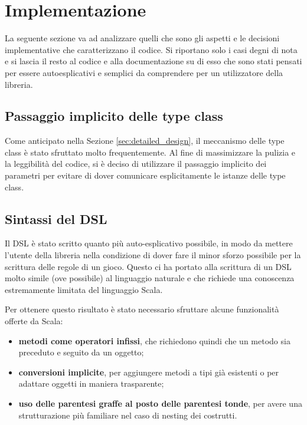 \section{Implementazione}

La seguente sezione va ad analizzare quelli che sono gli aspetti e le decisioni implementative che caratterizzano il codice.
%
Si riportano solo i casi degni di nota e si lascia il resto al codice e alla documentazione su di esso che sono stati pensati per essere autoesplicativi e semplici da comprendere per un utilizzatore della libreria.


\subsection{Passaggio implicito delle type class}

Come anticipato nella Sezione \ref{sec:detailed_design}, il meccanismo delle type class è stato sfruttato molto frequentemente.
%
Al fine di massimizzare la pulizia e la leggibilità del codice, si è deciso di utilizzare il passaggio implicito dei parametri per evitare di dover comunicare esplicitamente le istanze delle type class.


\subsection{Sintassi del DSL}

Il DSL è stato scritto quanto più auto-esplicativo possibile, in modo da mettere l'utente della libreria nella condizione di dover fare il minor sforzo possibile per la scrittura delle regole di un gioco.
%
Questo ci ha portato alla scrittura di un DSL molto simile (ove possibile) al linguaggio naturale e che richiede una conoscenza estremamente limitata del linguaggio Scala.

Per ottenere questo risultato è stato necessario sfruttare alcune funzionalità offerte da Scala:
\begin{itemize}
  \item \textbf{metodi come operatori infissi}, che richiedono quindi che un metodo sia preceduto e seguito da un oggetto;
  \item \textbf{conversioni implicite}, per aggiungere metodi a tipi già esistenti o per adattare oggetti in maniera trasparente;
  \item \textbf{uso delle parentesi graffe al posto delle parentesi tonde}, per avere una strutturazione più familiare nel caso di nesting dei costrutti.
\end{itemize}

